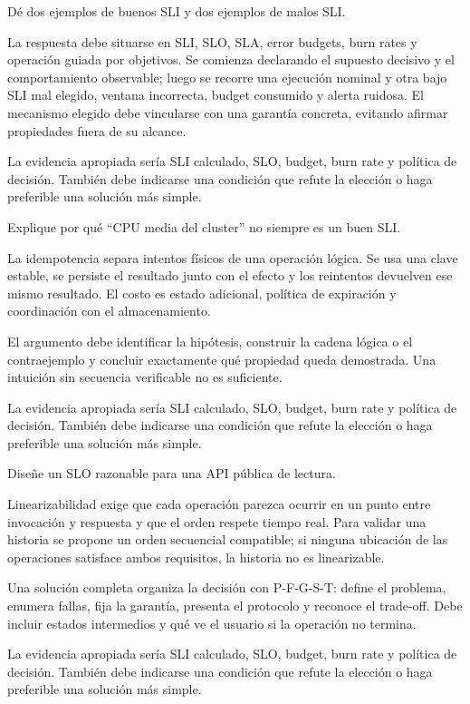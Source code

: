 \documentclass[variant=guia,cover=institutional,mode=screen]{ua-engineering-v6-article}
\begin{document}
\begin{uaexercise}
Dé dos ejemplos de buenos SLI y dos ejemplos de malos SLI.
\end{uaexercise}
\begin{uaanswer}
La respuesta debe situarse en SLI, SLO, SLA, error budgets, burn rates y operación guiada por objetivos. Se comienza declarando el supuesto decisivo y el comportamiento observable; luego se recorre una ejecución nominal y otra bajo SLI mal elegido, ventana incorrecta, budget consumido y alerta ruidosa. El mecanismo elegido debe vincularse con una garantía concreta, evitando afirmar propiedades fuera de su alcance.

La evidencia apropiada sería SLI calculado, SLO, budget, burn rate y política de decisión. También debe indicarse una condición que refute la elección o haga preferible una solución más simple.
\end{uaanswer}

\begin{uaexercise}
Explique por qué “CPU media del cluster” no siempre es un buen SLI.
\end{uaexercise}
\begin{uaanswer}
La idempotencia separa intentos físicos de una operación lógica. Se usa una clave estable, se persiste el resultado junto con el efecto y los reintentos devuelven ese mismo resultado. El costo es estado adicional, política de expiración y coordinación con el almacenamiento.

El argumento debe identificar la hipótesis, construir la cadena lógica o el contraejemplo y concluir exactamente qué propiedad queda demostrada. Una intuición sin secuencia verificable no es suficiente.

La evidencia apropiada sería SLI calculado, SLO, budget, burn rate y política de decisión. También debe indicarse una condición que refute la elección o haga preferible una solución más simple.
\end{uaanswer}

\begin{uaexercise}
Diseñe un SLO razonable para una API pública de lectura.
\end{uaexercise}
\begin{uaanswer}
Linearizabilidad exige que cada operación parezca ocurrir en un punto entre invocación y respuesta y que el orden respete tiempo real. Para validar una historia se propone un orden secuencial compatible; si ninguna ubicación de las operaciones satisface ambos requisitos, la historia no es linearizable.

Una solución completa organiza la decisión con P-F-G-S-T: define el problema, enumera fallas, fija la garantía, presenta el protocolo y reconoce el trade-off. Debe incluir estados intermedios y qué ve el usuario si la operación no termina.

La evidencia apropiada sería SLI calculado, SLO, budget, burn rate y política de decisión. También debe indicarse una condición que refute la elección o haga preferible una solución más simple.
\end{uaanswer}
\end{document}
